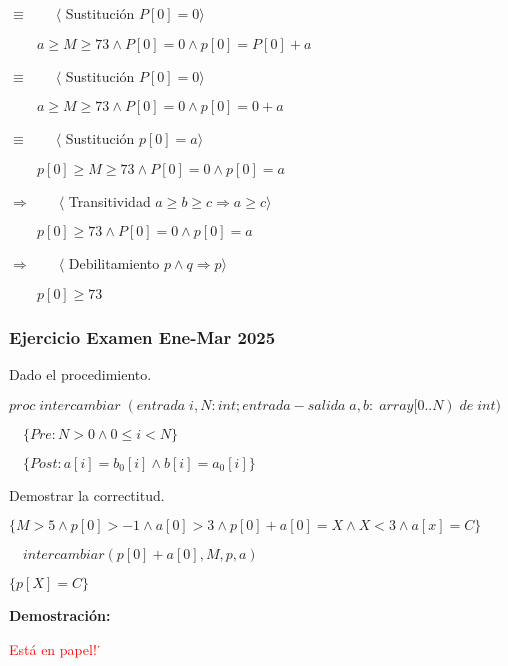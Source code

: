 \documentclass[hidelinks]{article}
\begin{document}
\begin{enumerate}
	      $\equiv \qquad \langle$ Sustitución $ P[0]=0 \rangle$ \par
	      $\qquad a \geq M \geq 73 \land P[0]=0 \land p[0] = P[0] + a$ \par
	      $\equiv \qquad \langle$ Sustitución $ P[0]=0 \rangle$ \par
	      $\qquad a \geq M \geq 73 \land P[0]=0 \land p[0] = 0 + a$ \par
	      $\equiv \qquad \langle$ Sustitución $ p[0]=a \rangle$ \par
	      $\qquad p[0] \geq M \geq 73 \land P[0]=0 \land p[0] = a$ \par
	      $\Rightarrow \qquad \langle$ Transitividad $ a \geq b \geq c \Rightarrow a \geq c \rangle$ \par
	      $\qquad p[0] \geq 73 \land P[0]=0 \land p[0] = a$ \par
	      $\Rightarrow \qquad \langle$ Debilitamiento $ p \land q \Rightarrow p \rangle$ \par
	      $\qquad p[0] \geq 73 $ \par
\end{enumerate}

\newpage


\subsubsection{Ejercicio Examen Ene-Mar 2025}

Dado el procedimiento. \par
$proc \; intercambiar \; (entrada \; i,N:int; entrada-salida \; a,b: \; array[0..N) \; de \; int) $ \par
$\quad \{Pre: N > 0 \land 0 \leq i < N\}$ \par
$\quad \{Post: a[i] = b_0[i] \land b[i] = a_0[i]\}$ \par

Demostrar la correctitud. \par

$\{M > 5 \land p[0] > -1 \land a[0] > 3 \land p[0] + a[0] = X \land X < 3 \land a[x] = C\}$ \par
$\quad intercambiar(p[0]+a[0],M,p,a)$ \par
$\{p[X] = C\}$ \par

\vspace{2em}

\textbf{Demostración:}\par \textcolor{red}{Está en papel!˙}
\end{document}
